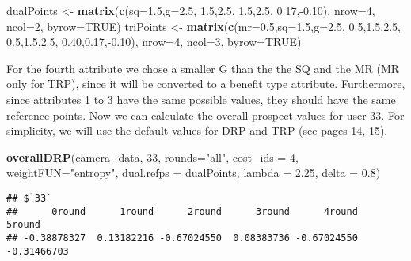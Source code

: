 \documentclass[]{article}
\newenvironment{Shaded}{\begin{snugshade}}{\end{snugshade}}
\newcommand{\KeywordTok}[1]{\textcolor[rgb]{0.13,0.29,0.53}{\textbf{{#1}}}}
\newcommand{\DataTypeTok}[1]{\textcolor[rgb]{0.13,0.29,0.53}{{#1}}}
\newcommand{\DecValTok}[1]{\textcolor[rgb]{0.00,0.00,0.81}{{#1}}}
\newcommand{\FloatTok}[1]{\textcolor[rgb]{0.00,0.00,0.81}{{#1}}}
\newcommand{\StringTok}[1]{\textcolor[rgb]{0.31,0.60,0.02}{{#1}}}
\newcommand{\OtherTok}[1]{\textcolor[rgb]{0.56,0.35,0.01}{{#1}}}
\newcommand{\NormalTok}[1]{{#1}}
\begin{document}
\begin{Shaded}
\begin{Highlighting}[]
\NormalTok{dualPoints <-}\StringTok{ }\KeywordTok{matrix}\NormalTok{(}\KeywordTok{c}\NormalTok{(}\DataTypeTok{sq=}\FloatTok{1.5}\NormalTok{,}\DataTypeTok{g=}\FloatTok{2.5}\NormalTok{,  }\FloatTok{1.5}\NormalTok{,}\FloatTok{2.5}\NormalTok{,  }\FloatTok{1.5}\NormalTok{,}\FloatTok{2.5}\NormalTok{,  }\FloatTok{0.17}\NormalTok{,-}\FloatTok{0.10}\NormalTok{),}
                     \DataTypeTok{nrow=}\DecValTok{4}\NormalTok{, }\DataTypeTok{ncol=}\DecValTok{2}\NormalTok{, }\DataTypeTok{byrow=}\OtherTok{TRUE}\NormalTok{)}
\NormalTok{triPoints <-}\StringTok{  }\KeywordTok{matrix}\NormalTok{(}\KeywordTok{c}\NormalTok{(}\DataTypeTok{mr=}\FloatTok{0.5}\NormalTok{,}\DataTypeTok{sq=}\FloatTok{1.5}\NormalTok{,}\DataTypeTok{g=}\FloatTok{2.5}\NormalTok{,  }\FloatTok{0.5}\NormalTok{,}\FloatTok{1.5}\NormalTok{,}\FloatTok{2.5}\NormalTok{,  }\FloatTok{0.5}\NormalTok{,}\FloatTok{1.5}\NormalTok{,}\FloatTok{2.5}\NormalTok{,  }\FloatTok{0.40}\NormalTok{,}\FloatTok{0.17}\NormalTok{,-}\FloatTok{0.10}\NormalTok{),}
                     \DataTypeTok{nrow=}\DecValTok{4}\NormalTok{, }\DataTypeTok{ncol=}\DecValTok{3}\NormalTok{, }\DataTypeTok{byrow=}\OtherTok{TRUE}\NormalTok{)}
\end{Highlighting}
\end{Shaded}

For the fourth attribute we chose a smaller G than the the SQ and the MR
(MR only for TRP), since it will be converted to a benefit type
attribute. Furthermore, since attributes 1 to 3 have the same possible
values, they should have the same reference points. Now we can calculate
the overall prospect values for user 33. For simplicity, we will use the
default values for DRP and TRP (see pages 14, 15).

\begin{Shaded}
\begin{Highlighting}[]
\KeywordTok{overallDRP}\NormalTok{(camera_data, }\DecValTok{33}\NormalTok{, }\DataTypeTok{rounds=}\StringTok{"all"}\NormalTok{, }\DataTypeTok{cost_ids =} \DecValTok{4}\NormalTok{, }\DataTypeTok{weightFUN=}\StringTok{"entropy"}\NormalTok{,}
           \DataTypeTok{dual.refps =} \NormalTok{dualPoints, }\DataTypeTok{lambda =} \FloatTok{2.25}\NormalTok{, }\DataTypeTok{delta =} \FloatTok{0.8}\NormalTok{)}
\end{Highlighting}
\end{Shaded}

\begin{verbatim}
## $`33`
##      0round      1round      2round      3round      4round      5round 
## -0.38878327  0.13182216 -0.67024550  0.08383736 -0.67024550 -0.31466703
\end{verbatim}
\end{document}
